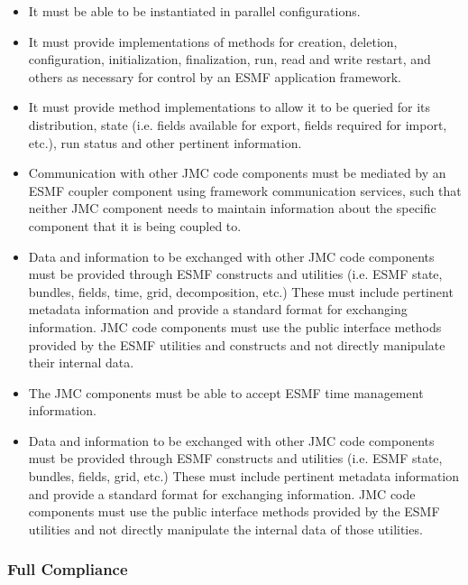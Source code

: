 \begin{itemize}
\item It must be able to be instantiated in parallel configurations.

\item It must provide implementations of methods for creation, deletion, 
configuration, initialization, finalization, run, read and write 
restart, and others as necessary for control by an ESMF application 
framework.

\item It must provide method implementations to allow it to be queried 
for its distribution, state (i.e. fields available for export, fields 
required for import, etc.), run status and other pertinent 
information.

\item Communication with other JMC code components must be mediated by an 
ESMF coupler component using framework communication services, such 
that neither JMC component needs to maintain information about the 
specific component that it is being coupled to. 

\item Data and information to be exchanged with other JMC code components
must be provided through ESMF constructs and utilities (i.e. ESMF state,
bundles, fields, time, grid, decomposition, etc.) These must include
pertinent metadata information and provide a standard format for
exchanging information. JMC code components must use the public
interface methods provided by the ESMF utilities and constructs and not
directly manipulate their internal data.

\item The JMC components must be able to accept ESMF time management 
information.

\item Data and information to be exchanged with other JMC code components
must be provided through ESMF constructs and utilities (i.e. ESMF state,
bundles, fields, grid, etc.) These must include
pertinent metadata information and provide a standard format for
exchanging information.  JMC code components must use the public 
interface methods provided by the ESMF utilities and not directly 
manipulate the internal data of those utilities.  

\end{itemize}

\subsubsection{Full Compliance}

